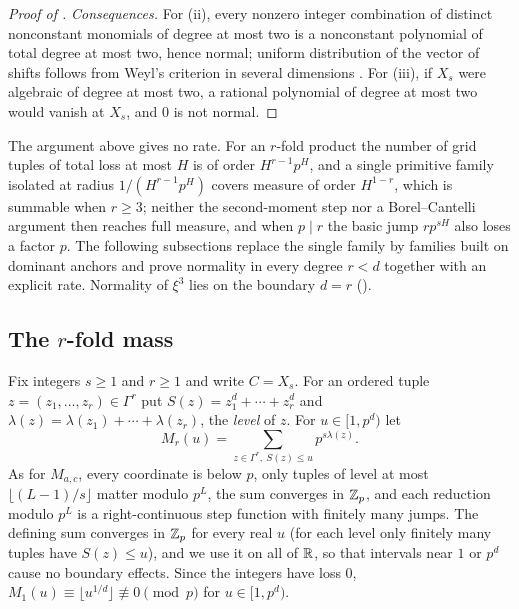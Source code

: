 \documentclass[11pt]{article}
\begin{document}
\begin{proof}[Proof of ]
\emph{Consequences.} For (ii), every nonzero integer combination of distinct nonconstant monomials of
degree at most two is a nonconstant polynomial of total degree at most two, hence normal; uniform
distribution of the vector of shifts follows from Weyl's criterion in several dimensions \cite[Chapter~1,
Theorem~6.2, p.~49]{KN}. For (iii), if $X_s$ were algebraic of degree at most two, a rational polynomial
of degree at most two would vanish at $X_s$, and $0$ is not normal.
\end{proof}

\begin{remark}\label{rem:quadscope}
The argument above gives no rate. For an $r$-fold product the number of grid tuples of total loss at
most $H$ is of order $H^{r-1}p^H$, and a single primitive family isolated at radius $1/(H^{r-1}p^H)$
covers measure of order $H^{1-r}$, which is summable when $r\ge3$; neither the second-moment step nor a
Borel--Cantelli argument then reaches full measure, and when $p\mid r$ the basic jump $rp^{sH}$ also
loses a factor $p$. The following subsections replace the single family by families built on dominant
anchors and prove normality in every degree $r<d$ together with an explicit rate. Normality of $\xi^3$
lies on the boundary $d=r$ ().
\end{remark}

\subsection{The \texorpdfstring{$r$}{r}-fold mass}\label{sec:rfold}

Fix integers $s\ge1$ and $r\ge1$ and write $C=X_s$. For an ordered tuple $z=(z_1,\ldots,z_r)\in\Gamma^r$ put
$S(z)=z_1^d+\cdots+z_r^d$ and $\lambda(z)=\lambda(z_1)+\cdots+\lambda(z_r)$, the \emph{level} of $z$. For
$u\in[1,p^d)$ let
\[
M_r(u)=\sum_{z\in\Gamma^r,\ S(z)\le u}p^{s\lambda(z)} .
\]
As for $M_{a,c}$, every coordinate is below $p$, only tuples of level at most $\lfloor(L-1)/s\rfloor$
matter modulo $p^L$, the sum converges in $\mathbb Z_p$, and each reduction modulo $p^L$ is a right-continuous
step function with finitely many jumps. The defining sum converges in $\mathbb Z_p$ for every real $u$ (for
each level only finitely many tuples have $S(z)\le u$), and we use it on all of $\mathbb R$, so that intervals
near $1$ or $p^d$ cause no boundary effects. Since the integers have loss $0$, $M_1(u)\equiv\lfloor
u^{1/d}\rfloor\not\equiv0\pmod p$ for $u\in[1,p^d)$.
\end{document}

